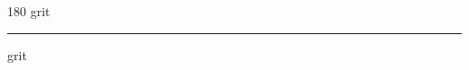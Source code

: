 
\begin{frame}
\begin{center}
\begin{turn}{180}
{\fontsize{2.5cm}{1em}\selectfont grit}
\end{turn}
\vspace{1em}\par  
\hrule
\vspace{1em}\par  
{\fontsize{2.5cm}{1em}\selectfont grit}
\end{center}
\end{frame}
